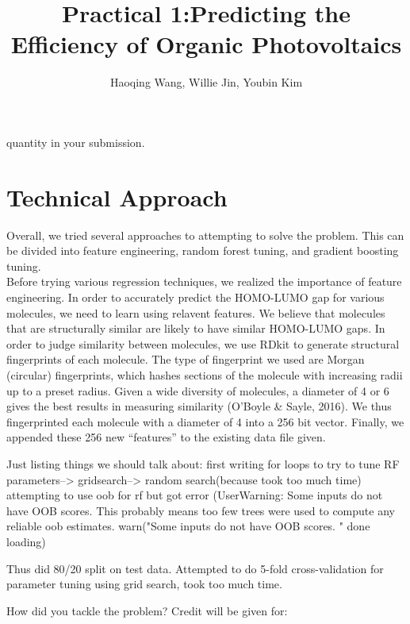 \documentclass[11pt]{article}
\title{Practical 1:Predicting the Efficiency of Organic Photovoltaics}
\author{Haoqing Wang, Willie Jin, Youbin Kim }
\begin{document}
\maketitle{}



quantity in your submission.

\section{Technical Approach}

Overall, we tried several approaches to attempting to solve the problem. This can be divided into feature engineering, random forest tuning, and gradient boosting tuning. \\

Before trying various regression techniques, we realized the importance of feature engineering. In order to accurately predict the HOMO-LUMO gap for various molecules, we need to learn using relavent features. We believe that molecules that are structurally similar are likely to have similar HOMO-LUMO gaps. In order to judge similarity between molecules, we use RDkit to generate structural fingerprints of each molecule. The type of fingerprint we used are Morgan (circular) fingerprints, which hashes sections of the molecule with increasing radii up to a preset radius. Given a wide diversity of molecules, a diameter of 4 or 6 gives the best results in measuring similarity (O'Boyle \& Sayle, 2016). We thus fingerprinted each molecule with a diameter of 4 into a 256 bit vector. Finally, we appended these 256 new ``features'' to the existing data file given.

Just listing things we should talk about: first writing for loops to try to tune RF parameters--> gridsearch--> random search(because took too much time)
attempting to use oob for rf but got error (UserWarning: Some inputs do not have OOB scores. This probably means too few trees were used to compute any reliable oob estimates.
warn("Some inputs do not have OOB scores. "
done loading)

Thus did 80/20 split on test data.
Attempted to do 5-fold cross-validation for parameter tuning using grid search, took too much time. 

How did you tackle the problem? Credit will be given for:
\end{document}
